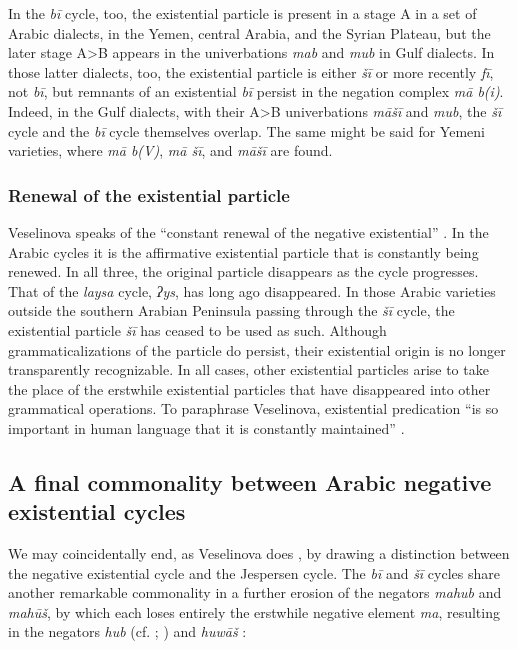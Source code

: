 \documentclass[output=paper]{langsci/langscibook}
\begin{document}
In the \textit{bī} cycle, too, the existential particle is present in a stage A in a set of Arabic dialects, in the Yemen, central Arabia, and the Syrian Plateau, but the later stage A>B appears in the univerbations \textit{mab} and \textit{mub} in Gulf dialects. In those latter dialects, too, the existential particle is either \textit{šī} or more recently \textit{fī}, not \textit{bī}, but remnants of an existential \textit{bī} persist in the negation complex \textit{mā b(i)}. Indeed, in the Gulf dialects, with their A>B univerbations \textit{māšī} and \textit{mub}, the \textit{šī} cycle and the \textit{bī} cycle themselves overlap. The same might be said for Yemeni varieties, where \textit{mā b(V)}, \textit{mā šī}, and \textit{māšī} are found. 

\subsubsection{Renewal of the existential particle} \label{s:WiAR-5.1.2}

Veselinova speaks of the “constant renewal of the negative existential” \citeyearpar[173]{Veselinova2016}. In the Arabic cycles it is the affirmative existential particle that is constantly being renewed. In all three, the original particle disappears as the cycle progresses. That of the \textit{laysa} cycle, \textit{ʔys}, has long ago disappeared. In those Arabic varieties outside the southern Arabian Peninsula passing through the \textit{šī} cycle, the existential particle \textit{šī} has ceased to be used as such. Although grammaticalizations of the particle do persist, their existential origin is no longer transparently recognizable. In all cases, other existential particles arise to take the place of the erstwhile existential particles that have disappeared into other grammatical operations. To paraphrase Veselinova, existential predication “is so important in human language that it is constantly maintained” \citep[173]{Veselinova2016}.

\subsection{A final commonality between Arabic negative existential cycles} \label{s:WiAR-5.1.3}

We may coincidentally end, as Veselinova does \citeyearpar[174]{Veselinova2016}, by drawing a distinction between the negative existential cycle and the Jespersen cycle. The \textit{bī} and \textit{šī} cycles share another remarkable commonality in a further erosion of the negators \textit{mahub} and \textit{mahūš}, by which each loses entirely the erstwhile negative element \textit{ma}, resulting in the negators \textit{hub} (cf. \citealp[64, 73, 116]{holes1990a}; \citeyear[106]{holes2016a}) and \textit{huwāš} \citep[22]{reinhardt1894a}:
\end{document}
